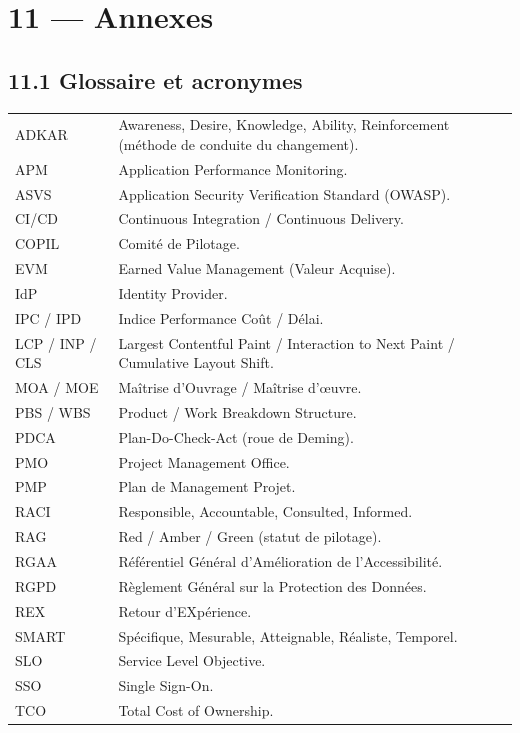 \documentclass[11pt,a4paper,oneside]{report}
\begin{document}
\newpage
\section*{11 --- Annexes}

\subsection*{11.1 Glossaire et acronymes}
\renewcommand{\arraystretch}{1.3}
\begin{tabularx}{\textwidth}{L{3.5cm} Y}
\toprule
{} &  \\
\midrule
ADKAR    & Awareness, Desire, Knowledge, Ability, Reinforcement (méthode de conduite du changement). \\
APM      & Application Performance Monitoring. \\
ASVS     & Application Security Verification Standard (OWASP). \\
CI/CD    & Continuous Integration / Continuous Delivery. \\
COPIL    & Comité de Pilotage. \\
EVM      & Earned Value Management (Valeur Acquise). \\
IdP      & Identity Provider. \\
IPC / IPD & Indice Performance Coût / Délai. \\
LCP / INP / CLS & Largest Contentful Paint / Interaction to Next Paint / Cumulative Layout Shift. \\
MOA / MOE & Maîtrise d'Ouvrage / Maîtrise d'œuvre. \\
PBS / WBS & Product / Work Breakdown Structure. \\
PDCA     & Plan-Do-Check-Act (roue de Deming). \\
PMO      & Project Management Office. \\
PMP      & Plan de Management Projet. \\
RACI     & Responsible, Accountable, Consulted, Informed. \\
RAG      & Red / Amber / Green (statut de pilotage). \\
RGAA     & Référentiel Général d'Amélioration de l'Accessibilité. \\
RGPD     & Règlement Général sur la Protection des Données. \\
REX      & Retour d'EXpérience. \\
SMART    & Spécifique, Mesurable, Atteignable, Réaliste, Temporel. \\
SLO      & Service Level Objective. \\
SSO      & Single Sign-On. \\
TCO      & Total Cost of Ownership. \\
\bottomrule
\end{tabularx}
\end{document}
